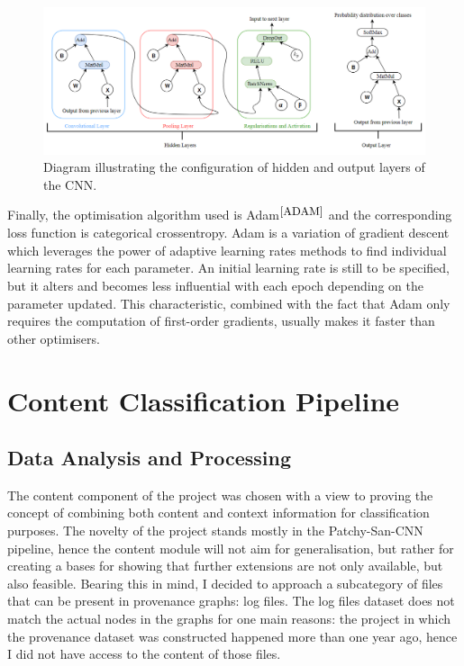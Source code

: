 \begin{figure}[H]
  \centering
  \centerline{\includegraphics[scale=0.5]{Images/cnn_layers.png}}
  \caption{Diagram illustrating the configuration of hidden and output layers of the CNN.}
  \label{cnn_layers}
\end{figure}

Finally, the optimisation algorithm used is Adam$^{\small \cite{ADAM}}$ and the corresponding loss function is categorical crossentropy. Adam is a variation of gradient descent which leverages the power of adaptive learning rates methods to find individual learning rates for each parameter. An initial learning rate is still to be specified, but it alters and becomes less influential with each epoch depending on the parameter updated. This characteristic, combined with the fact that Adam only requires the computation of first-order gradients, usually makes it faster than other optimisers.  


\section{Content Classification Pipeline}
\subsection{Data Analysis and Processing}

The content component of the project was chosen with a view to proving the concept of combining both content and context information for classification purposes. The novelty of the project stands mostly in the Patchy-San-CNN pipeline, hence the content module will not aim for generalisation, but rather for creating a bases for showing that further extensions are not only available, but also feasible. Bearing this in mind, I decided to approach a subcategory of files that can be present in provenance graphs: log files. The log files dataset does not match the actual nodes in the graphs for one main reasons: the project in which the provenance dataset was constructed happened more than one year ago, hence I did not have access to the content of those files. \\

